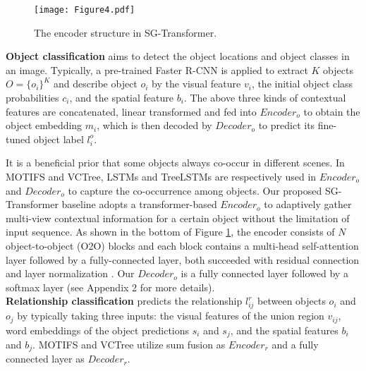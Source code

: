 \documentclass{article}
\begin{document}
\begin{figure}[t]
    \centering
    \texttt{[image: Figure4.pdf]}
    \caption{The encoder structure in SG-Transformer.}
    \label{fig:SGTransformer}
\end{figure}

\iffalse

\textbf{Object classification} aims to detect the object locations and object classes in an image. Typically, a pre-trained Faster R-CNN \cite{ren2015faster} is applied to extract $K$ objects $O=\{o_i\}^K$ and describe object $o_i$ by the visual feature $v_i$, the initial object class probabilities $c_i$, and the spatial feature $b_i$. The above three kinds of contextual features are concatenated, linear transformed and fed into $Encoder_o$ to obtain the object embedding $m_i$, which is then decoded by  $Decoder_o$ to predict its fine-tuned object label $l_i^o$.

It is a beneficial prior that some objects always co-occur in different scenes. In MOTIFS and VCTree, LSTMs and TreeLSTMs are respectively used in $Encoder_o$ and $Decoder_o$ to capture the  co-occurrence among objects. Our proposed SG-Transformer baseline adopts a transformer-based $Encoder_o$ to adaptively gather multi-view contextual information for a certain object without the limitation of input sequence. As shown in the bottom of Figure \ref{fig:SGTransformer}, the encoder consists of $N$ object-to-object (O2O) blocks 
and each block contains a multi-head self-attention layer followed  by  a  fully-connected  layer,  both  succeeded with residual connection and layer normalization \cite{vaswani2017attention}. Our $Decoder_o$ is a fully connected layer followed by a softmax layer (see Appendix 2 for more details).\\
\textbf{Relationship classification} predicts the relationship $l_{ij}^r$ between objects $o_i$ and  $o_j$ by typically taking three inputs: the visual features of the union region $v_{ij}$, word embeddings of the object predictions $s_i$ and $s_j$, and the spatial features $b_i$ and $b_j$. MOTIFS and VCTree utilize sum fusion as $Encoder_r$ and a fully connected layer as $Decoder_r$.
\end{document}
